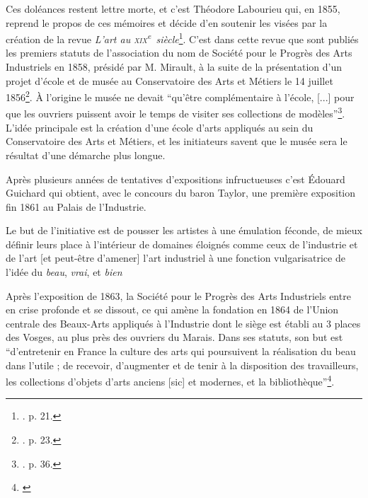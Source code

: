 Ces doléances restent lettre morte, et c'est Théodore Labourieu qui, en 1855, reprend le propos de ces mémoires et décide d'en soutenir les visées par la création de la revue \textit{L'art au \textsc{xix}\textsuperscript{e}~siècle}\footnote{\cite{froissart_union_1990}. p. 21.}. C'est dans cette revue que sont publiés les premiers statuts de l'association du nom de Société pour le Progrès des Arts Industriels en 1858, présidé par M. Mirault, à la suite de la présentation d'un projet d'école et de musée au Conservatoire des Arts et Métiers le 14 juillet 1856\footnote{\cite{froissart_union_1990}. p. 23.}. 
À l'origine le musée ne devait \enquote{qu'être complémentaire à l'école, [...] pour que les ouvriers puissent avoir le temps de visiter ses collections de modèles}\footnote{\cite{froissart_union_1990}. p. 36.}. L'idée principale est la création d'une école d'arts appliqués au sein du Conservatoire des Arts et Métiers, et les initiateurs savent que le musée sera le résultat d'une démarche plus longue.

Après plusieurs années de tentatives d'expositions infructueuses c'est Édouard Guichard qui obtient, avec le concours du baron Taylor, une première exposition fin 1861 au Palais de l'Industrie. 
\vspace{1em}

\noindent
\hspace*{1cm}
\begin{minipage}{\dimexpr\linewidth-2cm}
\fontsize{10}{12}\selectfont
Le but de l'initiative est de pousser les artistes à une émulation féconde, de mieux définir leurs place à l'intérieur de domaines éloignés comme ceux de l'industrie et de l'art [et peut-être d'amener] l'art industriel à une fonction vulgarisatrice de l'idée du \textit{beau}, \textit{vrai}, et \textit{bien}                                                        \footnotemark{}
\end{minipage}

\vspace{1em}



Après l'exposition de 1863, la Société pour le Progrès des Arts Industriels entre en crise profonde et se dissout, ce qui amène la fondation en 1864 de l'Union centrale des Beaux-Arts appliqués à l'Industrie dont le siège est établi au 3 places des Vosges, au plus près des ouvriers du Marais. Dans ses statuts, son but est \enquote{d'entretenir en France la culture des arts qui poursuivent la réalisation du beau dans l'utile ; de recevoir, d'augmenter et de tenir à la disposition des travailleurs, les collections d'objets d'arts anciens [sic] et modernes, et la bibliothèque}\footnote{\cite{noauthor__1864}}. 

